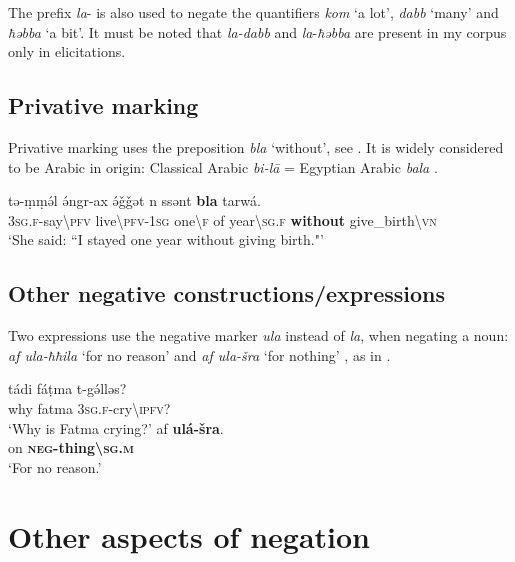 \documentclass[output=paper,colorlinks,citecolor=brown]{langscibook}
\begin{document}
The prefix \textit{la}{}- is also used to negate the quantifiers \textit{kom} ‘a lot’, \textit{dabb} ‘many’ and \textit{ħəbba} ‘a bit’. It must be noted that \textit{la-dabb} and \textit{la}{}-\textit{ħəbba} are present in my corpus only in elicitations.


\subsection{Privative marking}\label{sec:siw:3.3}

Privative marking uses the preposition \textit{bla} ‘without’, see . It is widely considered to be Arabic in origin: Classical Arabic \textit{bi-lā} = Egyptian Arabic \textit{bala} \citep[170]{Souag2013}. 

\ea\label{ex:siw:60}
    \gll tə-ṃṃə́l ə́ngr-ax ə́ǧǧət n ssənt \textbf{bla} tarwá.\\
         \textsc{3sg.f-}say{\textbackslash}\textsc{pfv} live{\textbackslash}\textsc{pfv-1sg} one{\textbackslash}\textsc{f} of year{\textbackslash}\textsc{sg.f} \textbf{without} give\_birth{\textbackslash}\textsc{vn} \\
    \glt ‘She said: “I stayed one year without giving birth."’
\z

\subsection{Other negative constructions/expressions} \label{sec:siw:3.4}

Two expressions use the negative marker \textit{ula} instead of \textit{la}, when negating a noun: \textit{af ula-ħħila} ‘for no reason’ \citep[210]{Souag2013} and \textit{af ula-šra} ‘for nothing’ \citep{Schiattarella2015}, as in .

\ea\label{ex:siw:61}
\begin{xlist}[A: ]
        \gll tádi fáṭma t-gə́lləs?\\
             why fatma \textsc{3sg.f}{}-cry{\textbackslash}\textsc{ipfv}?  \\
        \glt ‘Why is Fatma crying?’
        \gll  af \textbf{ulá-šra}. \\
             on \textbf{\textsc{neg}-thing{\textbackslash}\textsc{sg.m}} \\
        \glt ‘For no reason.’
\end{xlist}
\z

\section{Other aspects of negation}\label{sec:siw:4}
\end{document}
